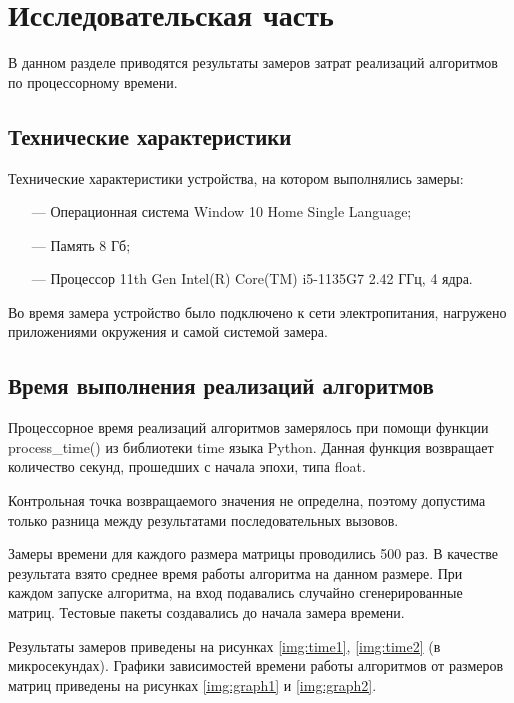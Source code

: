 \chapter{Исследовательская часть}

В данном разделе приводятся результаты замеров затрат реализаций алгоритмов по процессорному времени.

\section{Технические характеристики}

Технические характеристики устройства, на котором выполнялись замеры:

\begin{itemize}
	\item[---] Операционная система Window 10 Home Single Language;
	\item[---] Память 8 Гб;
	\item[---] Процессор 11th Gen Intel(R) Core(TM) i5-1135G7 2.42 ГГц, 4 ядра.
\end{itemize}

Во время замера устройство было подключено к сети электропитания, нагружено приложениями окружения и самой системой замера.

\section{Время выполнения реализаций алгоритмов}

Процессорное время реализаций алгоритмов замерялось при помощи функции process\_time() из библиотеки time языка Python. Данная функция возвращает количество секунд, прошедших с начала эпохи, типа float.

Контрольная точка возвращаемого значения не определна, поэтому допустима только разница между результатами последовательных вызовов.

Замеры времени для каждого размера матрицы проводились 500 раз. В качестве результата взято среднее время работы алгоритма на данном размере. При каждом запуске алгоритма, на вход подавались случайно сгенерированные матриц. Тестовые пакеты создавались до начала замера времени.

Результаты замеров приведены на рисунках \ref{img:time1}, \ref{img:time2} (в микросекундах). Графики зависимостей времени работы алгоритмов от размеров матриц приведены на рисунках \ref{img:graph1} и \ref{img:graph2}.



